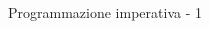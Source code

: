 \begin{frame}{Programmazione imperativa - 1}
\begin{columns}
\begin{column}{0.5\textwidth}
			\begin{figure}%
				\centering
				\qquad
				\\

\end{figure}
\end{column}
\end{columns}
\end{frame}
